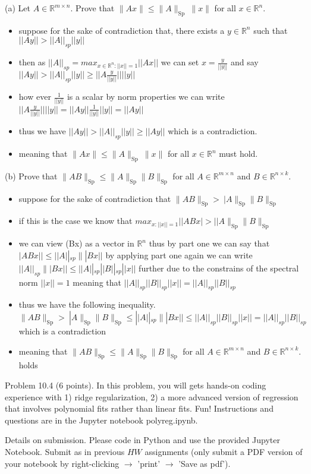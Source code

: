 \documentclass[10pt]{article}
\begin{document}
(a) Let $A \in \mathbb{R}^{m \times n}$. Prove that $\|A x\| \leq\|A\|_{\text {Sp }}\|x\|$ for all $x \in \mathbb{R}^{n}$.
\begin{itemize}
    \item suppose for the sake of contradiction that, there exists a $y\in \mathbb{R}^n$ such that $||Ay||>||A||_{sp}||y||$
    \item then as $||A||_{sp}=max_{x\in\mathbb{R}^{n}:||x||=1}||Ax||$ we can set $x=\frac{y}{||y||}$ and say $||Ay||>||A||_{sp}||y||\geq ||A\frac{y}{||y||}||||y||$ 
    \item how ever $\frac{1}{||y||}$ is a scalar by norm properties we can write $||A\frac{y}{||y||}||||y||=||Ay||\frac{1}{||y||}||y||=||Ay||$
    \item thus we have $||Ay||>||A||_{sp}||y||\geq ||Ay||$ which is a contradiction. 
    \item meaning that  $\|A x\| \leq\|A\|_{\text {Sp }}\|x\|$ for all $x \in \mathbb{R}^{n}$ must hold.
\end{itemize}

(b) Prove that $\|A B\|_{\mathrm{Sp}} \leq\|A\|_{\mathrm{Sp}}\|B\|_{\mathrm{Sp}}$ for all $A \in \mathbb{R}^{m \times n}$ and $B \in \mathbb{R}^{n \times k}$.
\begin{itemize}
    \item suppose for the sake of contradiction that $\|A B\|_{\mathrm{Sp}} >\
    |A\|_{\mathrm{Sp}}\|B\|_{\mathrm{Sp}}$ 
    \item if this is the case we know that $max_{x:||x||=1}||ABx|>||A\|_{\mathrm{Sp}}\|B\|_{\mathrm{Sp}}$ 
    \item we can view (Bx) as a vector in $\mathbb{R}^n$ thus by part one we can say that $|ABx||\leq ||A||_{sp}\||Bx||$ by applying part one again we can write $||A||_{sp}\||Bx||\leq ||A||_{sp}||B||_{sp}||x||$ further due to the constrains of the spectral norm $||x||=1$ meaning that $||A||_{sp}||B||_{sp}||x||=||A||_{sp}||B||_{sp}$
    \item thus we have the following inequality. $\|A B\|_{\mathrm{Sp}} > \
    |A\|_{\mathrm{Sp}}\|B\|_{\mathrm{Sp}}\leq ||A||_{sp}\||Bx||\leq ||A||_{sp}||B||_{sp}||x||=||A||_{sp}||B||_{sp}$ which is a contradiction 
    \item meaning that $\|A B\|_{\mathrm{Sp}} \leq\|A\|_{\mathrm{Sp}}\|B\|_{\mathrm{Sp}}$ for all $A \in \mathbb{R}^{m \times n}$ and $B \in \mathbb{R}^{n \times k}$. holds 
\end{itemize}

\newpage

Problem 10.4 (6 points). In this problem, you will gets hands-on coding experience with 1) ridge regularization, 2) a more advanced version of regression that involves polynomial fits rather than linear fits. Fun! Instructions and questions are in the Jupyter notebook polyreg.ipynb.

Details on submission. Please code in Python and use the provided Jupyter Notebook. Submit as in previous $H W$ assignments (only submit a PDF version of your notebook by right-clicking $\rightarrow$ 'print' $\rightarrow$ 'Save as pdf').
\end{document}
